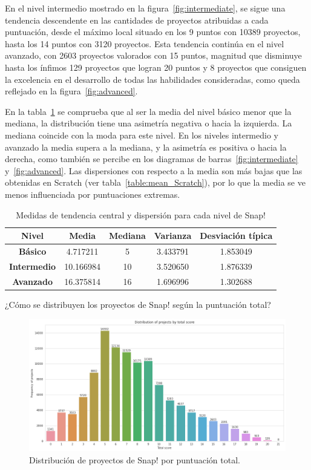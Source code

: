 \documentclass[a4paper, 12pt]{book}
\begin{document}
En el nivel intermedio mostrado en la figura~\ref{fig:intermediate}, se sigue una tendencia descendente en las cantidades de proyectos atribuidas a cada puntuación, desde el máximo local situado en los 9 puntos con 10389 proyectos, hasta los 14 puntos con 3120 proyectos. Esta tendencia continúa en el nivel avanzado, con 2603 proyectos valorados con 15 puntos, magnitud que disminuye hasta los ínfimos 129 proyectos que logran 20 puntos y 8 proyectos que consiguen la excelencia en el desarrollo de todas las habilidades consideradas, como queda reflejado en la figura~\ref{fig:advanced}.

En la tabla~\ref{table:mean_Snap} se comprueba que al ser la media del nivel básico menor que la mediana, la distribución tiene una asimetría negativa o hacia la izquierda. La mediana coincide con la moda para este nivel. En los niveles intermedio y avanzado la media supera a la mediana, y la asimetría es positiva o hacia la derecha, como también se percibe en los diagramas de barras~\ref{fig:intermediate} y~\ref{fig:advanced}.
Las dispersiones con respecto a la media son más bajas que las obtenidas en Scratch (ver tabla~\ref{table:mean_Scratch}), por lo que la media se ve menos influenciada por puntuaciones extremas. 

\begin{table}[H]
 \begin{center}
  \begin{tabular}{|c|c|c|c|c|}
    \hline
     \textbf{Nivel} & \textbf{Media} & \textbf{Mediana} & \textbf{Varianza} & \textbf{Desviación típica} \\ \hline
    \textbf{Básico} & 4.717211 & 5 & 3.433791 & 1.853049 \\ \hline
    \textbf{Intermedio} & 10.166984 & 10 & 3.520650 & 1.876339 \\ \hline
    \textbf{Avanzado} & 16.375814 & 16 & 1.696996 & 1.302688 \\ \hline
  \end{tabular}
  \caption{Medidas de tendencia central y dispersión para cada nivel de Snap!}
  \label{table:mean_Snap}
 \end{center}
\end{table}

¿Cómo se distribuyen los proyectos de Snap! según la puntuación total?

\begin{figure}[H]
    \centering
    \includegraphics[width=.9\textwidth]{img/frequency_total_score.png}
    \caption{Distribución de proyectos de Snap! por puntuación total.}\label{fig:total}
\end{figure}
\end{document}
